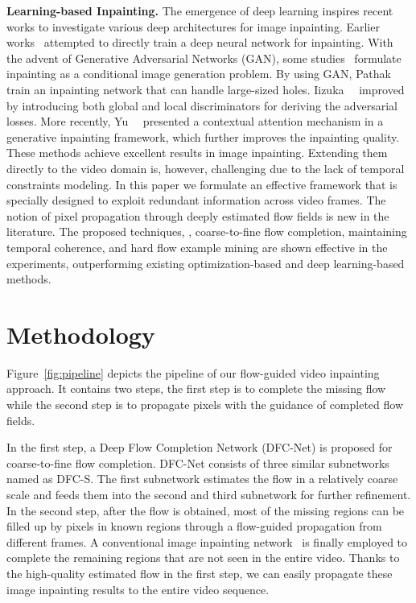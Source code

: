 \documentclass[10pt,twocolumn,letterpaper]{article}
\begin{document}
\noindent
\textbf{Learning-based Inpainting.}
The emergence of deep learning inspires recent works to investigate various deep architectures for image inpainting.
Earlier works~\cite{kohler2014mask, ren2015shepard} attempted to directly train a deep neural network for inpainting. 
With the advent of Generative Adversarial Networks (GAN), some studies~\cite{iizuka2017globally, pathak2016context, yu2018generative} formulate inpainting as a conditional image generation problem.
By using GAN, Pathak~\etal~\cite{pathak2016context} train an inpainting network that can handle large-sized holes.
Iizuka~\etal~\cite{iizuka2017globally} improved~\cite{pathak2016context} by introducing both global and local discriminators for deriving the adversarial losses.
More recently, Yu~\etal~\cite{yu2018generative} presented a contextual attention mechanism in a generative inpainting framework, which further improves the inpainting quality.
These methods achieve excellent results in image inpainting. Extending them directly to the video domain is, however, challenging due to the lack of temporal constraints modeling.
In this paper we formulate an effective framework that is specially designed to exploit redundant information across video frames. The notion of pixel propagation through deeply estimated flow fields is new in the literature. The proposed techniques, \eg, coarse-to-fine flow completion, maintaining temporal coherence, and hard flow example mining are shown effective in the experiments, outperforming existing optimization-based and deep learning-based methods.

 


\section{Methodology}
\label{sec:approach}





Figure~\ref{fig:pipeline} depicts the pipeline of our flow-guided video inpainting approach.
It contains two steps, the first step is to complete the missing flow while the second step is to propagate pixels with the guidance of completed flow fields.

In the first step, a Deep Flow Completion Network (DFC-Net) is proposed for coarse-to-fine flow completion.
DFC-Net consists of three similar subnetworks named as DFC-S.
The first subnetwork estimates the flow in a relatively coarse scale and feeds them into the second and third subnetwork for further refinement.
In the second step, after the flow is obtained, most of the missing regions can be filled up by pixels in known regions through a flow-guided propagation from different frames.
A conventional image inpainting network~\cite{yu2018generative} is finally employed to complete the remaining regions that are not seen in the entire video.
Thanks to the high-quality estimated flow in the first step, we can easily propagate these image inpainting results to the entire video sequence.
\end{document}
